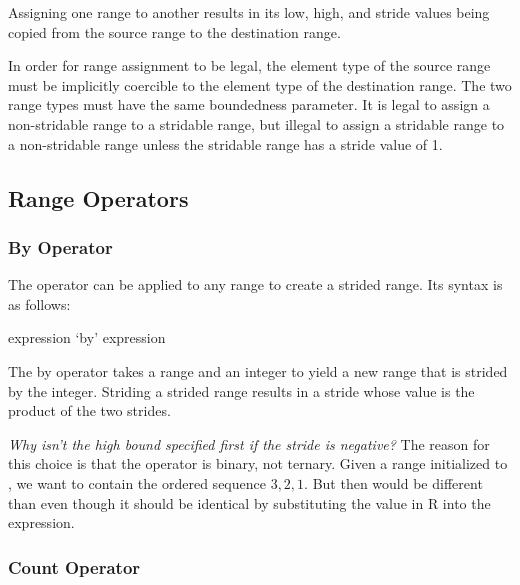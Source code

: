Assigning one range to another results in its low, high, and stride
values being copied from the source range to the destination range.

In order for range assignment to be legal, the element type of the
source range must be implicitly coercible to the element type of the
destination range.  The two range types must have the same boundedness
parameter.  It is legal to assign a non-stridable range to a stridable
range, but illegal to assign a stridable range to a non-stridable
range unless the stridable range has a stride value of 1.


\subsection{Range Operators}
\label{Range_Operators}

\subsubsection{By Operator}
\label{Strided_Ranges}

The  operator can be applied to any range to create a strided
range.  Its syntax is as follows:

\begin{syntax}
expression `by' expression
\end{syntax}

The by operator takes a range and an integer to yield a new range that
is strided by the integer.  Striding a strided range results in a
stride whose value is the product of the two strides.

\begin{rationale}
{\it Why isn't the high bound specified first if the stride is
negative?}  The reason for this choice is that the  operator
is binary, not ternary.  Given a range  initialized
to , we want  to contain the ordered sequence
$3,2,1$.  But then  would be different than  even though it should be identical by substituting the value in
R into the expression.
\end{rationale}

\subsubsection{Count Operator}
\label{Count_Operator}

